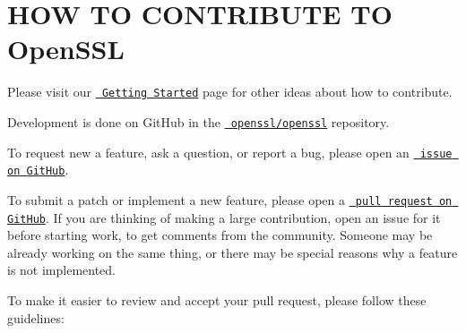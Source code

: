 \chapter{HOW TO CONTRIBUTE TO Open\+SSL}
\hypertarget{md__c_1_2_users_2namph_2_downloads_2openssl_2openssl-3_82_81_2_c_o_n_t_r_i_b_u_t_i_n_g}{}\label{md__c_1_2_users_2namph_2_downloads_2openssl_2openssl-3_82_81_2_c_o_n_t_r_i_b_u_t_i_n_g}
Please visit our \href{https://www.openssl.org/community/getting-started.html>}{\texttt{ Getting Started}} page for other ideas about how to contribute.

Development is done on Git\+Hub in the \href{https://github.com/openssl/openssl>}{\texttt{ openssl/openssl}} repository.

To request new a feature, ask a question, or report a bug, please open an \href{https://github.com/openssl/openssl/issues}{\texttt{ issue on Git\+Hub}}.

To submit a patch or implement a new feature, please open a \href{https://github.com/openssl/openssl/pulls}{\texttt{ pull request on Git\+Hub}}. If you are thinking of making a large contribution, open an issue for it before starting work, to get comments from the community. Someone may be already working on the same thing, or there may be special reasons why a feature is not implemented.

To make it easier to review and accept your pull request, please follow these guidelines\+:


